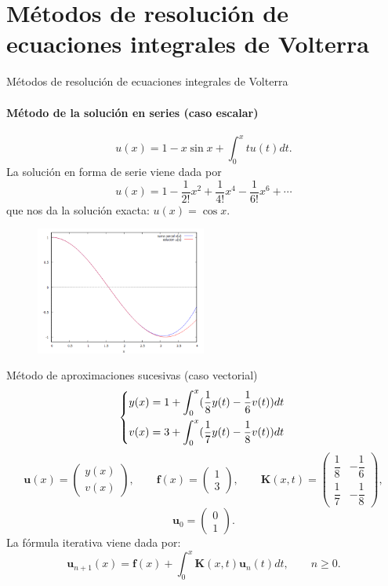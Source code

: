 \documentclass{beamer}
\begin{document}
\section{Métodos de resolución de ecuaciones integrales de Volterra}
\begin{frame}{Métodos de resolución de ecuaciones integrales de Volterra}
	\framesubtitle{Método de la solución en series (caso escalar)}
	\begin{equation*}
		u(x) = 1 - x \sin x + \int_{0}^{x} tu(t)dt.
	\end{equation*}
	La solución en forma de serie viene dada por
	\begin{equation*}
		u(x) = 1 - \dfrac{1}{2!}x^2 + \dfrac{1}{4!}x^4-\dfrac{1}{6!}x^6+\cdots
	\end{equation*}
	que nos da la solución exacta: $u(x) = \cos x.$
	\begin{figure}[h!]
		\centering
		\includegraphics[width=0.5\textwidth]{suma_parcial_sol}
	\end{figure}
\end{frame}
\begin{frame}{Método de aproximaciones sucesivas (caso vectorial)}
	\[ \begin{dcases}
		y(x) = 1 + \displaystyle \int_0^x (\dfrac{1}{8}y(t)-\dfrac{1}{6}v(t))dt \\
		v(x) = 3+ \displaystyle \int_0^x (\dfrac{1}{7}y(t)-\dfrac{1}{8}v(t))dt \;
	\end{dcases} \]%
	\begin{equation*}
		\textbf{u}(x) = \begin{pmatrix}	y(x) \\[6pt] v(x)	\end{pmatrix}, \qquad \textbf{f}(x) = \begin{pmatrix}	1 \\[6pt] 3	\end{pmatrix}, \qquad \textbf{K}(x,t) = \begin{pmatrix}	\dfrac{1}{8} & -\dfrac{1}{6} \\[9pt] \dfrac{1}{7} & -\dfrac{1}{8}	\end{pmatrix},
	\end{equation*}
\begin{equation*}
	\textbf{u}_0 = \begin{pmatrix}	0 \\ 1	\end{pmatrix}.
\end{equation*}
	La fórmula iterativa viene dada por:
	\begin{equation*}
		\textbf{u}_{n+1}(x) = \textbf{f}(x) + \int_0^x \textbf{K}(x,t)\textbf{u}_n(t)dt, \qquad n \geqslant 0.
	\end{equation*}
\end{frame}
\end{document}
